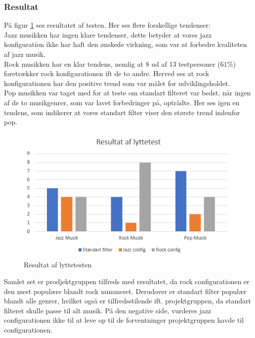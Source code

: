 \subsubsection{Resultat}
På figur \ref{fig:lytteresultat} ses resultatet af testen. Her ses flere forskellige tendenser:  \\Jazz musikken har ingen klare tendenser, dette betyder at vores jazz konfiguration ikke har haft den ønskede virkning, som var at forbedre kvaliteten af jazz musik. \\Rock musikken har en klar tendens, nemlig at 8 ud af 13 testpersoner (61\%) foretrækker rock konfigurationen ift de to andre. Herved ses at rock konfigurationen har den positive trend som var målet for udviklingsholdet. \\
Pop musikken var taget med for at teste om standart filteret var bedst, når ingen af de to musikgenrer, som var lavet forbedringer på, optrådte. Her ses igen en tendens, som indikerer at vores standart filter viser den største trend indenfor pop. 
 
\begin{figure}[H] 
	\center
	\includegraphics[width=0.8\linewidth]{figur/lytteresultat}\quad
	\caption{Resultat af lyttetesten}
	\label{fig:lytteresultat}
\end{figure}
Samlet set er prodjektgruppen tilfreds med resultatet, da rock configurationen er den mest populære blandt rock nummeret. Derudover er standart filter populær blandt alle genrer, hvilket også er tilfredsstilende ift. projektgruppen, da standart filteret skulle passe til alt musik. På den negative side, vurderes jazz configurationen ikke til at leve op til de forventninger projektgruppen havde til configurationen.  


